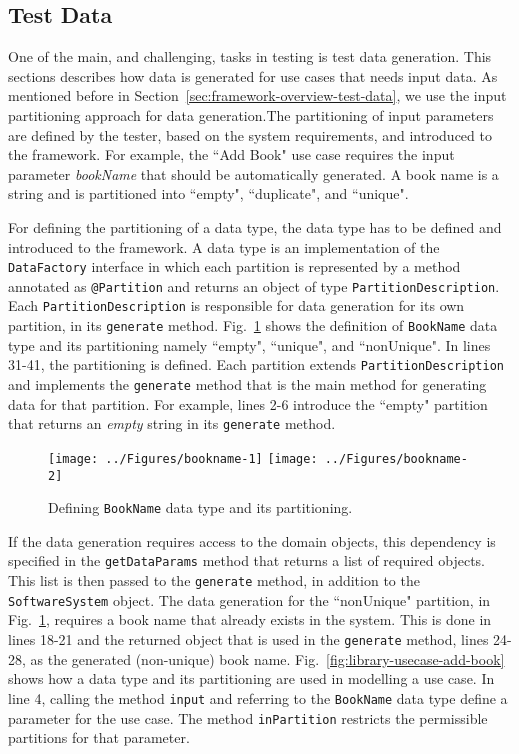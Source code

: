 \subsection{Test Data}
\label{sec:create-test model-data}
One of the main, and challenging, tasks in testing is test data generation. This sections describes how data is generated for use cases that needs input data. As mentioned before in Section~\ref{sec:framework-overview-test-data}, we use the input partitioning approach for data generation.The partitioning of input parameters are defined by the tester, based on the system requirements, and introduced to the framework. For example, the ``Add Book" use case requires the input parameter \textit{bookName} that should be automatically generated. A book name is a string and is partitioned into ``empty", ``duplicate", and ``unique".

For defining the partitioning of a data type, the data type has to be defined and introduced to the framework. A data type is an implementation of the \texttt{DataFactory} interface in which each partition is represented by a method annotated as \texttt{@Partition} and returns an object of type \texttt{PartitionDescription}. Each \texttt{PartitionDescription} is responsible for data generation for its own partition, in its \texttt{generate} method. Fig.~\ref{fig:library-bookname} shows the definition of \texttt{BookName} data type and its partitioning namely ``empty", ``unique", and ``nonUnique". In lines 31-41, the partitioning is defined. Each partition extends  \texttt{PartitionDescription} and implements the \texttt{generate} method that is the main method for generating data for that partition. For example, lines 2-6 introduce the ``empty" partition that returns an \textit{empty} string in its \texttt{generate} method.

\begin{figure}[h]
\centering
{\texttt{[image: ../Figures/bookname-1]}%
\label{fig:library-bookname-1}}
\hfil
{\texttt{[image: ../Figures/bookname-2]}%
\label{fig:library-bookname-2}}
\caption{Defining \texttt{BookName} data type and its partitioning.}
\label{fig:library-bookname}
\end{figure} 

If the data generation requires access to the domain objects, this dependency is specified in the \texttt{getDataParams} method that returns a list of required objects. This list is then passed to the \texttt{generate} method, in addition to the \texttt{SoftwareSystem} object. The data generation for the ``nonUnique" partition, in Fig.~\ref{fig:library-bookname}, requires a book name that already exists in the system. This is done in lines 18-21 and the returned object that is used in the \texttt{generate} method, lines 24-28, as the generated (non-unique) book name. Fig.~\ref{fig:library-usecase-add-book} shows how a data type and its partitioning are used in modelling a use case. In line 4, calling the method \texttt{input} and referring to the \texttt{BookName} data type define a parameter for the use case. The method \texttt{inPartition} restricts the permissible partitions for that parameter.

